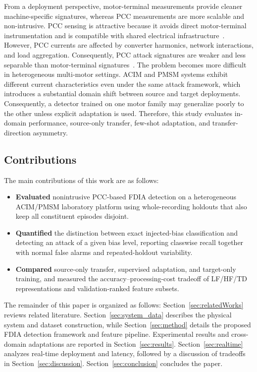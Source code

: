 \documentclass[letterpaper,journal]{IEEEtran}
\begin{document}
From a deployment perspective, motor-terminal measurements provide cleaner machine-specific signatures, whereas PCC measurements are more scalable and non-intrusive. PCC sensing is attractive because it avoids direct motor-terminal instrumentation and is compatible with shared electrical infrastructure~\cite{7271086}. However, PCC currents are affected by converter harmonics, network interactions, and load aggregation. Consequently, PCC attack signatures are weaker and less separable than motor-terminal signatures~\cite{10005067}.
The problem becomes more difficult in heterogeneous multi-motor settings. ACIM and PMSM systems exhibit different current characteristics even under the same attack framework, which introduces a substantial domain shift between source and target deployments. Consequently, a detector trained on one motor family may generalize poorly to the other unless explicit adaptation is used. Therefore, this study evaluates in-domain performance, source-only transfer, few-shot adaptation, and transfer-direction asymmetry.
\subsection{Contributions}
\label{sec:contributions}
The main contributions of this work are as follows:

\begin{itemize}
\item \textbf{Evaluated} nonintrusive PCC-based FDIA detection on a heterogeneous ACIM/PMSM laboratory platform using whole-recording holdouts that also keep all constituent episodes disjoint.
\item \textbf{Quantified} the distinction between exact injected-bias classification and detecting an attack of a given bias level, reporting classwise recall together with normal false alarms and repeated-holdout variability.
\item \textbf{Compared} source-only transfer, supervised adaptation, and target-only training, and measured the accuracy--processing-cost tradeoff of LF/HF/TD representations and validation-ranked feature subsets.
\end{itemize}

The remainder of this paper is organized as follows: Section~\ref{sec:relatedWorks} reviews related literature. Section~\ref{sec:system_data} describes the physical system and dataset construction, while Section~\ref{sec:method} details the proposed FDIA detection framework and feature pipeline. Experimental results and cross-domain adaptations are reported in Section~\ref{sec:results}. Section~\ref{sec:realtime} analyzes real-time deployment and latency, followed by a discussion of tradeoffs in Section~\ref{sec:discussion}. Section~\ref{sec:conclusion} concludes the paper.
\end{document}
